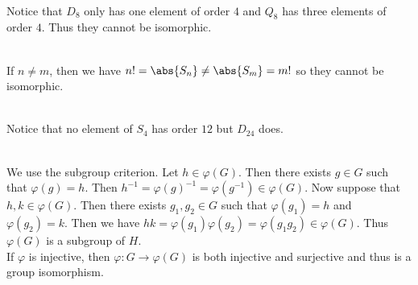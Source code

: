 \documentclass[a4paper]{article}
\begin{document}
\begin{ex}{}{}\\
Notice that $D_8$ only has one element of order $4$ and $Q_8$ has three elements of order $4$. Thus they cannot be isomorphic. 
\end{ex}

\begin{ex}{}{}\\
If $n\neq m$, then we have $n!=\abs{S_n}\neq\abs{S_m}=m!$ so they cannot be isomorphic. 
\end{ex}

\begin{ex}{}{}\\
Notice that no element of $S_4$ has order $12$ but $D_{24}$ does. 
\end{ex}

\begin{ex}{}{}
\end{ex}

\begin{ex}{}{}
\end{ex}

\begin{ex}{}{}
\end{ex}

\begin{ex}{}{}
\end{ex}

\begin{ex}{}{}\\
We use the subgroup criterion. Let $h\in\varphi(G)$. Then there exists $g\in G$ such that $\varphi(g)=h$. Then $h^{-1}=\varphi(g)^{-1}=\varphi(g^{-1})\in\varphi(G)$. Now suppose that $h,k\in\varphi(G)$. Then there exists $g_1,g_2\in G$ such that $\varphi(g_1)=h$ and $\varphi(g_2)=k$. Then we have $hk=\varphi(g_1)\varphi(g_2)=\varphi(g_1g_2)\in\varphi(G)$. Thus $\varphi(G)$ is a subgroup of $H$. \\

If $\varphi$ is injective, then $\varphi:G\to\varphi(G)$ is both injective and surjective and thus is a group isomorphism. 
\end{ex}

\begin{ex}{}{}
\end{ex}

\begin{ex}{}{}
\end{ex}

\begin{ex}{}{}
\end{ex}
\end{document}
